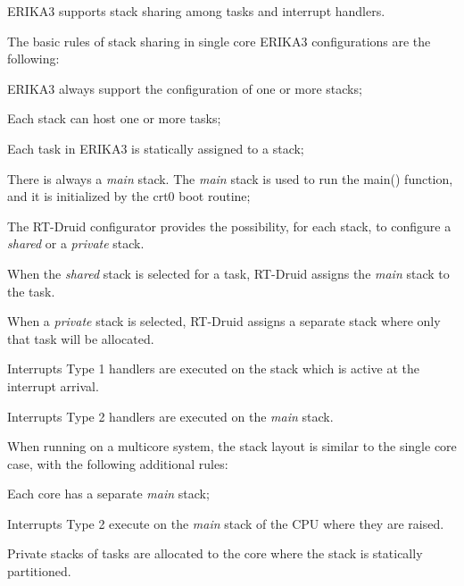 E\+R\+I\+K\+A3 supports stack sharing among tasks and interrupt handlers.

The basic rules of stack sharing in single core E\+R\+I\+K\+A3 configurations are the following\+:
\begin{DoxyItemize}
\item E\+R\+I\+K\+A3 always support the configuration of one or more stacks;
\item Each stack can host one or more tasks;
\item Each task in E\+R\+I\+K\+A3 is statically assigned to a stack;
\item There is always a {\itshape main} stack. The {\itshape main} stack is used to run the main() function, and it is initialized by the crt0 boot routine;
\item The R\+T-\/\+Druid configurator provides the possibility, for each stack, to configure a {\itshape shared} or a {\itshape private} stack.
\begin{DoxyItemize}
\item When the {\itshape shared} stack is selected for a task, R\+T-\/\+Druid assigns the {\itshape main} stack to the task.
\item When a {\itshape private} stack is selected, R\+T-\/\+Druid assigns a separate stack where only that task will be allocated.
\end{DoxyItemize}
\item Interrupts Type 1 handlers are executed on the stack which is active at the interrupt arrival.
\item Interrupts Type 2 handlers are executed on the {\itshape main} stack.
\end{DoxyItemize}

When running on a multicore system, the stack layout is similar to the single core case, with the following additional rules\+:
\begin{DoxyItemize}
\item Each core has a separate {\itshape main} stack;
\item Interrupts Type 2 execute on the {\itshape main} stack of the C\+PU where they are raised.
\item Private stacks of tasks are allocated to the core where the stack is statically partitioned. 
\end{DoxyItemize}